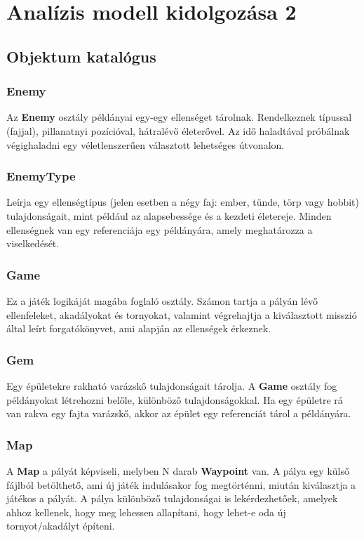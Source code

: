 %
\chapter{Analízis modell kidolgozása 2}

\thispagestyle{fancy}

\section{Objektum katalógus}

\subsection{Enemy}
Az \textbf{Enemy} osztály példányai egy-egy ellenséget tárolnak. Rendelkeznek típussal (fajjal), pillanatnyi pozícióval, hátralévő életerővel. Az idő haladtával próbálnak végighaladni egy véletlenszerűen választott lehetséges útvonalon.

\subsection{EnemyType}
Leírja egy ellenségtípus (jelen esetben a négy faj: ember, tünde, törp vagy hobbit) tulajdonságait, mint például az alapsebessége és a kezdeti életereje. Minden ellenségnek van egy referenciája egy példányára, amely meghatározza a viselkedését.

\subsection{Game}
Ez a játék logikáját magába foglaló osztály. Számon tartja a pályán lévő ellenfeleket, akadályokat és tornyokat, valamint végrehajtja a kiválasztott misszió által leírt forgatókönyvet, ami alapján az ellenségek érkeznek.

\subsection{Gem}
Egy épületekre rakható varázskő tulajdonságait tárolja. A \textbf{Game} osztály fog példányokat létrehozni belőle, különböző tulajdonságokkal. Ha egy épületre rá van rakva egy fajta varázskő, akkor az épület egy referenciát tárol a példányára.

\subsection{Map}
A \textbf{Map} a pályát képviseli, melyben N darab \textbf{Waypoint} van. A pálya egy külső fájlból betölthető, ami új játék indulásakor fog megtörténni, miután kiválasztja a játékos a pályát. A pálya különböző tulajdonságai is lekérdezhetőek, amelyek ahhoz kellenek, hogy meg lehessen allapítani, hogy lehet-e oda új tornyot/akadályt építeni.

